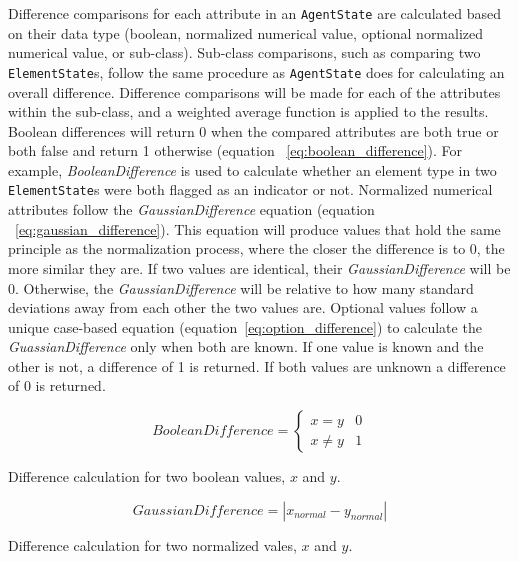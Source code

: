 Difference comparisons for each attribute in an \texttt{AgentState} are calculated based on their data type (boolean, normalized numerical value, optional normalized numerical value, or sub-class).
Sub-class comparisons, such as comparing two \texttt{ElementState}s, follow the same procedure as \texttt{AgentState} does for calculating an overall difference.
Difference comparisons will be made for each of the attributes within the sub-class, and a weighted average function is applied to the results.
Boolean differences will return 0 when the compared attributes are both true or both false and return 1 otherwise (equation ~\ref{eq:boolean_difference}).
For example, \textit{BooleanDifference} is used to calculate whether an element type in two \texttt{ElementState}s were both flagged as an indicator or not.
Normalized numerical attributes follow the \textit{GaussianDifference} equation (equation ~\ref{eq:gaussian_difference}).
This equation will produce values that hold the same principle as the normalization process, where the closer the difference is to 0, the more similar they are.
If two values are identical, their \textit{GaussianDifference} will be 0.
Otherwise, the \textit{GaussianDifference} will be relative to how many standard deviations away from each other the two values are.
Optional values follow a unique case-based equation (equation~\ref{eq:option_difference}) to calculate the \textit{GuassianDifference} only when both are known.
If one value is known and the other is not, a difference of 1 is returned.
If both values are unknown a difference of 0 is returned.

\begin{capeq}
\begin{equation} \label{eq:boolean_difference}
  BooleanDifference = \begin{cases}
    x = y & 0 \\
    x \neq y & 1
  \end{cases}
\end{equation}
\caption{Difference calculation for two boolean values, $x$ and $y$.}
\end{capeq}

\begin{capeq}
\begin{equation} \label{eq:gaussian_difference}
  GaussianDifference = |x_{normal} - y_{normal}|
\end{equation}
\caption{Difference calculation for two normalized vales, $x$ and $y$.}
\end{capeq}

